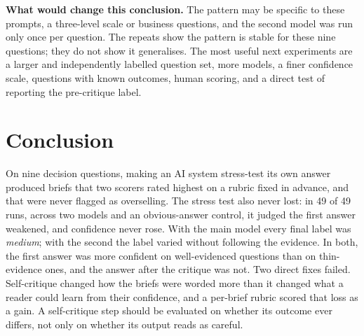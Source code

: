\documentclass[11pt]{article}
\begin{document}
\textbf{What would change this conclusion.} The pattern may be specific to these prompts, a three-level scale or business questions, and the second model was run only once per question. The repeats show the pattern is stable for these nine questions; they do not show it generalises. The most useful next experiments are a larger and independently labelled question set, more models, a finer confidence scale, questions with known outcomes, human scoring, and a direct test of reporting the pre-critique label.

\section{Conclusion}

On nine decision questions, making an AI system stress-test its own answer produced briefs that two scorers rated highest on a rubric fixed in advance, and that were never flagged as overselling. The stress test also never lost: in 49 of 49 runs, across two models and an obvious-answer control, it judged the first answer weakened, and confidence never rose. With the main model every final label was \emph{medium}; with the second the label varied without following the evidence. In both, the first answer was more confident on well-evidenced questions than on thin-evidence ones, and the answer after the critique was not. Two direct fixes failed. Self-critique changed how the briefs were worded more than it changed what a reader could learn from their confidence, and a per-brief rubric scored that loss as a gain. A self-critique step should be evaluated on whether its outcome ever differs, not only on whether its output reads as careful.
\end{document}

